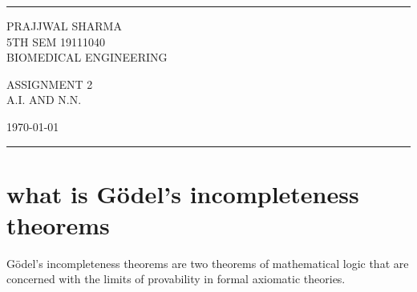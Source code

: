\documentclass[a4paper]{article}
\begin{document}

\fancyhead[C]{}
\hrule \medskip %
\begin{minipage}{0.295\textwidth} 
\raggedright
\footnotesize
PRAJJWAL SHARMA \hfill\\   
5TH SEM 19111040\hfill\\
BIOMEDICAL ENGINEERING
\end{minipage}
\begin{minipage}{0.4\textwidth} 
\centering 
\large 
ASSIGNMENT 2\\ 
\normalsize 
A.I. AND N.N.\\ 
\end{minipage}
\begin{minipage}{0.295\textwidth} 
\raggedleft
\today\hfill\\
\end{minipage}
\medskip\hrule 
\bigskip


\section{what is Gödel's incompleteness theorems }

Gödel's incompleteness theorems are two theorems of mathematical logic that are concerned with the limits of provability in formal axiomatic theories.
\end{document}
